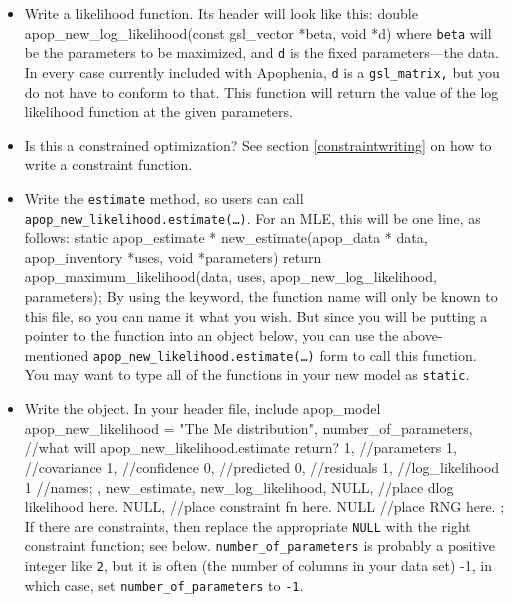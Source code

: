 \begin{itemize}
\item Write a likelihood function. Its header will look like this:
double apop_new_log_likelihood(const gsl_vector *beta, void *d)
where {\tt beta} will be the parameters to be maximized, and {\tt d} is the fixed parameters---the data. In every case currently included
with Apophenia, {\tt d} is a {\tt gsl\_\-matrix,} but you do not have to conform
to that. This function will return the value of the log likelihood function at the given parameters.

\item Is this a constrained optimization? See section
\ref{constraintwriting} on how to write a constraint function.

\item Write the {\tt estimate} method, so users can call 
{\tt apop\_\-new\_\-like\-li\-hood.est\-i\-mate(\dots)}. For an MLE, this will be one line,
as follows:
static apop_estimate * new_estimate(apop_data * data, 
                        apop_inventory *uses, void *parameters){
    return apop_maximum_likelihood(data, uses, 
                            apop_new_log_likelihood, parameters);
}
By using the  keyword, the function name will only be
known to this file, so you can name it what you wish.  But since you
will be putting a pointer to the function into an object below, you
can use the above-mentioned {\tt apop\_\-new\_\-likelihood.estimate(\dots)}
form to call this function. You may want to type all of the functions in
your new model as {\tt static}.


\item Write the object. In your header file, include 
apop_model apop_new_likelihood = {"The Me distribution", 
            number_of_parameters, 
{       //what will apop_new_likelihood.estimate return?
        1,      //parameters 
        1,      //covariance
        1,      //confidence
        0,      //predicted
        0,      //residuals
        1,      //log_likelihood
        1       //names;
},          new_estimate,
            new_log_likelihood, 
            NULL,   //place dlog likelihood here.
            NULL,   //place constraint fn here.
            NULL    //place RNG here.
            };
If there are constraints, then replace the appropriate {\tt NULL} with the right constraint function; see below.
{\tt number\_\-of\_\-parameters} is probably a positive integer like {\tt 2}, but
it is often (the number of columns in your data set) -1, in which case,
set {\tt number\_\-of\_\-parameters} to {\tt -1}.


\end{itemize}
